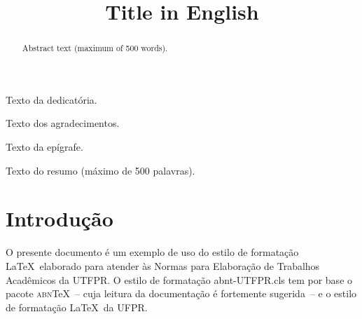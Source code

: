 \documentclass{abnt-UTFPR} %
\title{Title in English} %
\begin{document}
\capa %
\folhaderosto %

\begin{dedicatoria}
Texto da dedicat\'oria.
\end{dedicatoria}

\begin{agradecimentos}
Texto dos agradecimentos.
\end{agradecimentos}

\begin{epigrafe}
Texto da ep\'igrafe.
\end{epigrafe}

\begin{resumo}
Texto do resumo (m\'aximo de 500 palavras).
\end{resumo}

\begin{abstract}
Abstract text (maximum of 500 words).
\end{abstract}

\listadefiguras %
\listadetabelas %
\listadesiglas %
\listadesimbolos %

\sumario %


%
%
%
%


\chapter{Introdu\c{c}\~ao}

O presente documento \'e um exemplo de uso do estilo de formata\c{c}\~ao \LaTeX\ elaborado para atender \`as Normas para Elabora\c{c}\~ao de Trabalhos Acad\^emicos da UTFPR. O estilo de formata\c{c}\~ao {\ttfamily abnt-UTFPR.cls} tem por base o pacote \textsc{abn}\TeX~-- cuja leitura da documenta\c{c}\~ao \cite{abnTeX2009} \'e fortemente sugerida~-- e o estilo de formata\c{c}\~ao \LaTeX\ da UFPR.
\end{document}
